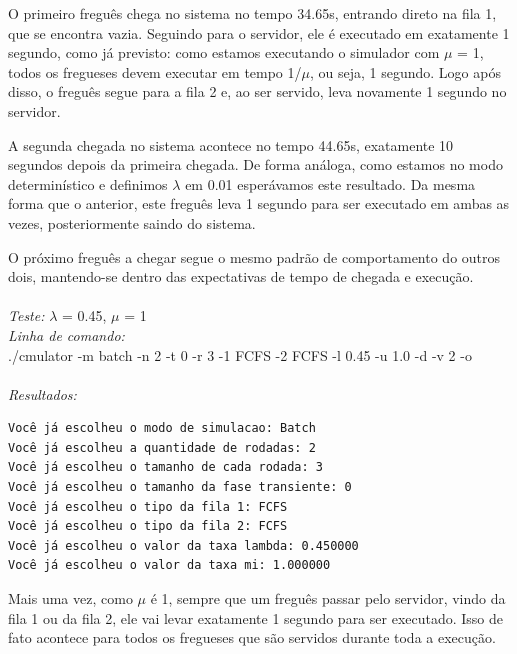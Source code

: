 \documentclass[a4paper,10pt]{article}
\begin{document}
O primeiro freguês chega no sistema no tempo 34.65s, entrando direto na fila 1, que se encontra vazia. Seguindo para o servidor, ele é executado em exatamente 1 segundo, como já previsto: como estamos executando o simulador com $\mu$ = 1, todos os fregueses devem executar em tempo 1/$\mu$, ou seja, 1 segundo. Logo após disso, o freguês segue para a fila 2 e, ao ser servido, leva novamente 1 segundo no servidor.

A segunda chegada no sistema acontece no tempo 44.65s, exatamente 10 segundos depois da primeira chegada. De forma análoga, como estamos no modo determinístico e definimos $\lambda$ em 0.01 esperávamos este resultado. Da mesma forma que o anterior, este freguês leva 1 segundo para ser executado em ambas as vezes, posteriormente saindo do sistema.

O próximo freguês a chegar segue o mesmo padrão de comportamento do outros dois, mantendo-se dentro das expectativas de tempo de chegada e execução.
\\
\\
\emph{Teste:} $\lambda$ = 0.45, $\mu$ = 1
\\
\emph{Linha de comando:}
\\
./cmulator -m batch -n 2 -t 0 -r 3 -1 FCFS -2 FCFS -l 0.45 -u 1.0 -d -v 2 -o
\\
\\
\emph{Resultados:}
\\\begin{verbatim}
Você já escolheu o modo de simulacao: Batch
Você já escolheu a quantidade de rodadas: 2
Você já escolheu o tamanho de cada rodada: 3
Você já escolheu o tamanho da fase transiente: 0
Você já escolheu o tipo da fila 1: FCFS
Você já escolheu o tipo da fila 2: FCFS
Você já escolheu o valor da taxa lambda: 0.450000
Você já escolheu o valor da taxa mi: 1.000000
\end{verbatim}

    Mais uma vez, como $\mu$ é 1, sempre que um freguês passar pelo servidor, vindo da fila 1 ou da fila 2, ele vai levar exatamente 1 segundo para ser executado. Isso de fato acontece para todos os fregueses que são servidos durante toda a execução.
\end{document}
